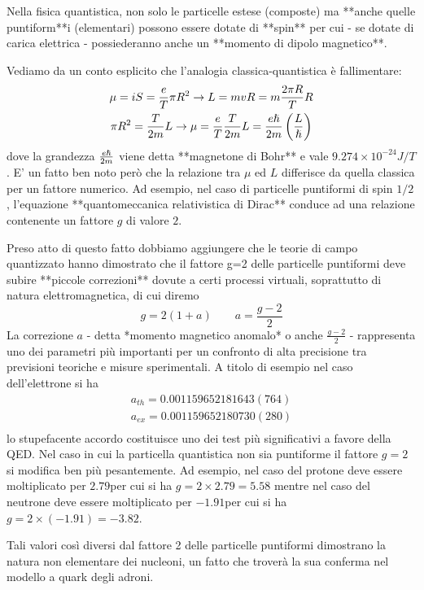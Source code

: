 Nella fisica quantistica, non solo le particelle estese (composte) ma **anche quelle puntiform**i (elementari) possono essere dotate di **spin** per cui - se dotate di carica elettrica - possiederanno anche un **momento di dipolo magnetico**.

Vediamo da un conto esplicito che l'analogia classica-quantistica è fallimentare:
\begin{gather*}
    \mu = i S = \frac{e}{T}\pi R^2 \rightarrow L = mvR = m \frac{2 \pi R}{T}R\\
    \pi R^2 = \frac{T}{2m}L \rightarrow \mu = \frac{e}{T}\frac{T}{2m}L = \frac{e \hslash}{2m}\left( \frac{L}{\hslash}\right)\\
\end{gather*}
dove la grandezza $\frac{e \hslash}{2m}$ viene detta **magnetone di Bohr** e vale $9.274\times 10^{-24}J/T$.
E' un fatto ben noto però che la relazione tra $\mu$ ed $L$ differisce da quella classica per un fattore numerico.
Ad esempio, nel caso di particelle puntiformi di spin $1/2$, l'equazione **quantomeccanica relativistica di Dirac** conduce ad una relazione contenente un fattore $g$ di valore $2$.

Preso atto di questo fatto dobbiamo aggiungere che le teorie di campo quantizzato hanno dimostrato che il fattore g=2 delle particelle puntiformi deve subire **piccole correzioni** dovute a certi processi virtuali, soprattutto di natura elettromagnetica, di cui diremo
\[
g = 2(1+a) \qquad a = \frac{g -2}{2}
\]
La correzione $a$ - detta *momento magnetico anomalo* o anche $\frac{g -2}{2}$ - rappresenta uno dei parametri più importanti per un confronto di alta precisione tra previsioni teoriche e misure sperimentali.
A titolo di esempio nel caso dell'elettrone si ha
\begin{gather*}
    a_{th} = 0.001 159 652 181 643 (764)\\
    a_{ex} = 0.001 159 652 180 730 (280)\\
\end{gather*}
lo stupefacente accordo costituisce uno dei test più significativi a favore della QED.
Nel caso in cui la particella quantistica non sia puntiforme il fattore $g=2$ si modifica ben più pesantemente.
Ad esempio, nel caso del protone deve essere moltiplicato per $2.79$per cui si ha $g=2 \times 2.79=5.58$ mentre nel caso del neutrone deve essere moltiplicato per $-1.91$per cui si ha $g=2 \times(-1.91) = -3.82$.

Tali valori così diversi dal fattore 2 delle particelle puntiformi dimostrano la natura non elementare dei nucleoni, un fatto che troverà la sua conferma nel modello a quark degli adroni.

